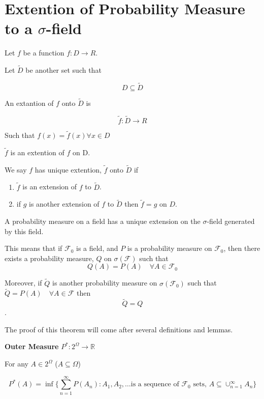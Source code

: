 \documentclass[11pt,fleqn]{book} %
\begin{document}
\section{Extention of Probability Measure to a $\sigma$-field}

Let $f$ be a function $f: D\rightarrow R$. 

Let $\tilde{D}$ be another set such that 

$$D \subseteq \tilde{D} $$

An extantion of $f$ onto  $\tilde{D}$ is 

$$\tilde{f}: \tilde{D} \rightarrow R $$

Such that $f(x) = \tilde{f}(x) \forall x \in D$

$\tilde{f}$ is an extention of $f$ on D. 

We say $f$ has unique extention, $\tilde{f}$ onto $\tilde{D}$ if 

\begin{enumerate}
	\item $\tilde{f}$ is an extension of $f$ to $\tilde{D}$.

	\item if $g$ is another extension of $f$ to $\tilde{D}$ then $\tilde{f} = g$ on $D$.
\end{enumerate}


\begin{theorem}
	A probability measure on a field has a unique extension on the $\sigma$-field generated by this field. 

		This means that if $\mathscr{F}_0$ is a field, and $P$ is a probability measure on $\mathscr{F}_0$, then there exists a probability measure, $Q$ on $\sigma(\mathscr{F})$ such that 
		$$Q(A) = P(A)\quad \forall A \in \mathscr{F}_0$$

		Moreover, if $\tilde{Q}$ is another probability measure on $\sigma(\mathscr{F}_0)$ such that $\tilde{Q} = P(A) \quad \forall A \in \mathscr{F}$ then $$\tilde{Q} = Q$$. 
\end{theorem}

	\begin{remark}
		The proof of this theorem will come after several definitions and lemmas. 
	\end{remark}

	\textbf{Outer Measure} $P^*: 2^\Omega \rightarrow \mathbb{R}$  

	For any $A \in 2^\Omega$ ($A \subseteq \Omega$)

	$$P^*(A) = \inf \{\displaystyle \sum_{n=1}^\infty P(A_n): A_1, A_2, \dots \text{is a sequence of } \mathscr{F}_0 \text{ sets, } A \subseteq \cup^\infty_{n=1} A_n\} $$
\end{document}
